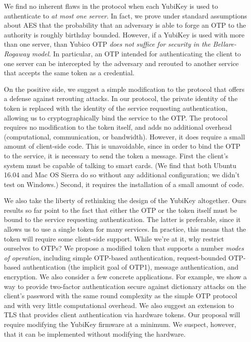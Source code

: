 We find no inherent flaws in the protocol when each YubiKey is used to
authenticate to \emph{at most one server}. In fact, we prove under standard
assumptions about AES that the probability that an adversary is able to forge an OTP to
the authority is roughly birthday bounded.
%
However, if a YubiKey is used with more than one server, than Yubico OTP
\emph{does not suffice for security in the Bellare-Rogaway model}.
%
In particular, an OTP intended for authenticating the client to one server can
be intercepted by the adversary and rerouted to another service that accepts the
same token as a credential.

On the positive side, we suggest a simple modification to the protocol that
offers a defense against rerouting attacks. In our protocol, the private
identity of the token is replaced with the identity of the service requesting
authentication, allowing us to cryptographically bind the service to the OTP.
%
The protocol requires no modification to the token itself, and adds no
additional overhead (computational, communication, or bandwidth). However, it
does require a small amount of client-side code. This is unavoidable, since in order to
bind the OTP to the service, it is necessary to send the token a message. First
the client's system must be capable of talking to smart cards. (We find that
both Ubuntu 16.04 and Mac OS Sierra do so without any additional
configuration; we didn't test on Windows.)
%
\fi
%
Second, it requires the installation of a small amount of code.

We also take the liberty of rethinking the design of the YubiKey altogether.
%
Ours results so far point to the fact that either the OTP or the token itself
must be bound to the service requesting authentication. The latter is
preferable, since it allows us to use a single token for many services.
%
In practice, this means that the token will require some client-side support.
While we're at it, why restrict ourselves to OTPs?
%
We propose a modified token that supports a number \emph{modes of operation},
including simple OTP-based authentication, request-bounded OTP-based
authentication (the implicit goal of OTP1), message authentication, and
encryption.
%
We also consider a few concrete applications. For example, we show a way to provide
two-factor authentication secure against dictionary attacks on the client's
password with the same round complexity as the simple OTP protocol and with very
little computational overhead. We also suggest an extension to TLS that provides
client authentication via hardware tokens.
%
Our proposal will require modifying the YubiKey firmware at a minimum. We
suspect, however, that it can be implemented without modifying the hardware.


